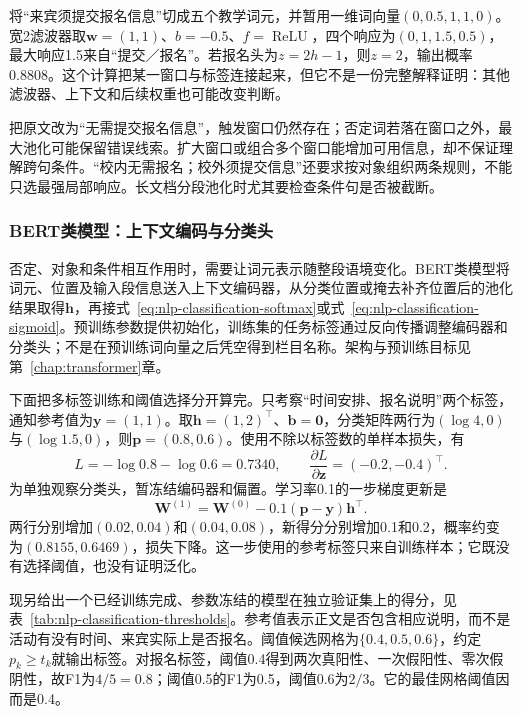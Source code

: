 将“来宾须提交报名信息”切成五个教学词元，并暂用一维词向量$(0,0.5,1,1,0)$。宽2滤波器取$\bm w=(1,1)$、$b=-0.5$、$f=\operatorname{ReLU}$，四个响应为$(0,1,1.5,0.5)$，最大响应1.5来自“提交／报名”。若报名头为$z=2h-1$，则$z=2$，输出概率0.8808。这个计算把某一窗口与标签连接起来，但它不是一份完整解释证明：其他滤波器、上下文和后续权重也可能改变判断。

把原文改为“无需提交报名信息”，触发窗口仍然存在；否定词若落在窗口之外，最大池化可能保留错误线索。扩大窗口或组合多个窗口能增加可用信息，却不保证理解跨句条件。“校内无需报名；校外须提交信息”还要求按对象组织两条规则，不能只选最强局部响应。长文档分段池化时尤其要检查条件句是否被截断。

\subsubsection{BERT类模型：上下文编码与分类头}
\label{sec:nlp-classification-bert}

否定、对象和条件相互作用时，需要让词元表示随整段语境变化。BERT类模型将词元、位置及输入段信息送入上下文编码器，从分类位置或掩去补齐位置后的池化结果取得$\bm h$，再接式~\eqref{eq:nlp-classification-softmax}或式~\eqref{eq:nlp-classification-sigmoid}。预训练参数提供初始化，训练集的任务标签通过反向传播调整编码器和分类头；不是在预训练词向量之后凭空得到栏目名称。架构与预训练目标见第~\ref{chap:transformer}章。

下面把多标签训练和阈值选择分开算完。只考察“时间安排、报名说明”两个标签，通知参考值为$\bm y=(1,1)$。取$\bm h=(1,2)^\top$、$\bm b=\bm0$，分类矩阵两行为$(\log4,0)$与$(\log1.5,0)$，则$\bm p=(0.8,0.6)$。使用不除以标签数的单样本损失，有
\[
  L=-\log0.8-\log0.6=0.7340,\qquad
  \frac{\partial L}{\partial\bm z}=(-0.2,-0.4)^\top.
\]
为单独观察分类头，暂冻结编码器和偏置。学习率0.1的一步梯度更新是
\[
  \bm W^{(1)}=\bm W^{(0)}
  -0.1(\bm p-\bm y)\bm h^\top.
\]
两行分别增加$(0.02,0.04)$和$(0.04,0.08)$，新得分分别增加0.1和0.2，概率约变为$(0.8155,0.6469)$，损失下降。这一步使用的参考标签只来自训练样本；它既没有选择阈值，也没有证明泛化。

现另给出一个已经训练完成、参数冻结的模型在独立验证集上的得分，见表~\ref{tab:nlp-classification-thresholds}。参考值表示正文是否包含相应说明，而不是活动有没有时间、来宾实际上是否报名。阈值候选网格为$\{0.4,0.5,0.6\}$，约定$p_k\geq t_k$就输出标签。对报名标签，阈值0.4得到两次真阳性、一次假阳性、零次假阴性，故F1为$4/5=0.8$；阈值0.5的F1为0.5，阈值0.6为$2/3$。它的最佳网格阈值因而是0.4。

